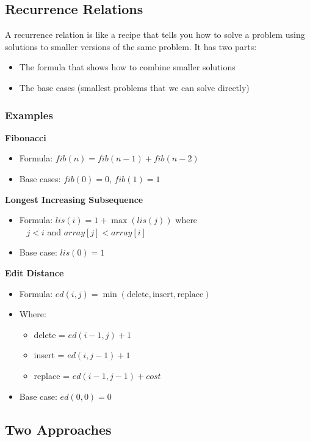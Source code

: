 \documentclass[11pt,a4paper]{article}
\begin{document}
\begin{multicols}{2}
\subsection{Recurrence Relations}
A recurrence relation is like a recipe that tells you how to solve a problem using solutions to smaller versions of the same problem.
It has two parts:
\begin{itemize}
    \item The formula that shows how to combine smaller solutions
    \item The base cases (smallest problems that we can solve directly)
\end{itemize}

\subsubsection{Examples}
\textbf{Fibonacci}
\begin{itemize}
    \item Formula: $fib(n) = fib(n-1) + fib(n-2)$
    \item Base cases: $fib(0) = 0$, $fib(1) = 1$
\end{itemize}

\textbf{Longest Increasing Subsequence}
\begin{itemize}
    \item Formula: $lis(i) = 1 + \max(lis(j))$ where \\~ $j < i$ and $array[j] < array[i]$
    \item Base case: $lis(0) = 1$
\end{itemize}

\textbf{Edit Distance}
\begin{itemize}
    \item Formula: $ed(i,j) = \min(\text{delete}, \text{insert}, \text{replace})$
    \item Where:
    \begin{itemize}
        \item delete = $ed(i-1,j) + 1$
        \item insert = $ed(i,j-1) + 1$
        \item replace = $ed(i-1,j-1) + cost$
    \end{itemize}
    \item Base case: $ed(0,0) = 0$
\end{itemize}

\subsection{Two Approaches}

\end{multicols}
\end{document}
